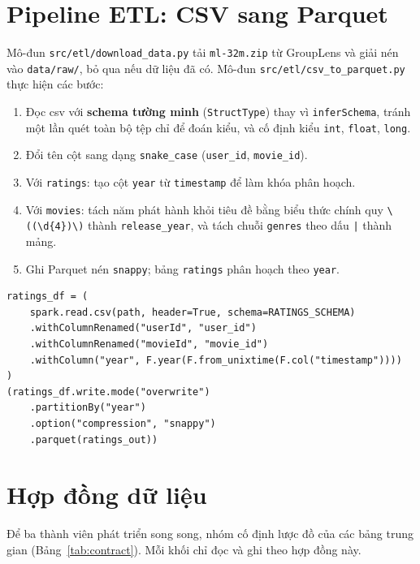 \section{Pipeline ETL: CSV sang Parquet}
\label{sec:etl}
Mô-đun \texttt{src/etl/download\_data.py} tải \texttt{ml-32m.zip} từ GroupLens và giải nén vào \texttt{data/raw/}, bỏ qua nếu dữ liệu đã có. Mô-đun \texttt{src/etl/csv\_to\_parquet.py} thực hiện các bước:
\begin{enumerate}
    \item Đọc \gls{csv} với \textbf{schema tường minh} (\texttt{StructType}) thay vì \texttt{inferSchema}, tránh một lần quét toàn bộ tệp chỉ để đoán kiểu, và cố định kiểu \texttt{int}, \texttt{float}, \texttt{long}.
    \item Đổi tên cột sang dạng \texttt{snake\_case} (\texttt{user\_id}, \texttt{movie\_id}).
    \item Với \texttt{ratings}: tạo cột \texttt{year} từ \texttt{timestamp} để làm khóa phân hoạch.
    \item Với \texttt{movies}: tách năm phát hành khỏi tiêu đề bằng biểu thức chính quy \texttt{\textbackslash((\textbackslash d\{4\})\textbackslash)} thành \texttt{release\_year}, và tách chuỗi \texttt{genres} theo dấu \texttt{|} thành mảng.
    \item Ghi Parquet nén \texttt{snappy}; bảng \texttt{ratings} phân hoạch theo \texttt{year}.
\end{enumerate}

\begin{lstlisting}[caption={Ghi bảng ratings ra Parquet phân hoạch theo năm}, label={lst:etl}]
ratings_df = (
    spark.read.csv(path, header=True, schema=RATINGS_SCHEMA)
    .withColumnRenamed("userId", "user_id")
    .withColumnRenamed("movieId", "movie_id")
    .withColumn("year", F.year(F.from_unixtime(F.col("timestamp"))))
)
(ratings_df.write.mode("overwrite")
    .partitionBy("year")
    .option("compression", "snappy")
    .parquet(ratings_out))
\end{lstlisting}


\section{Hợp đồng dữ liệu}
\label{sec:contract}
Để ba thành viên phát triển song song, nhóm cố định lược đồ của các bảng trung gian (Bảng~\ref{tab:contract}). Mỗi khối chỉ đọc và ghi theo hợp đồng này.

